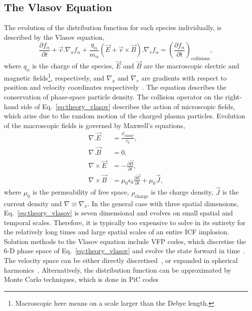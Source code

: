 \subsection{The Vlasov Equation}%
\label{sec:theory_vlasov}

The evolution of the distribution function for each species individually, is described by the Vlasov equation,
\begin{equation}
    \label{eq:theory_vlasov}
    \frac{\partial f_\alpha}{\partial t} + \vec{v}.\nabla_x f_\alpha + \frac{q_\alpha}{m_\alpha} (\vec{E} + \vec{v}\times\vec{B}) . \nabla_v f_\alpha = \left ( \frac{\partial f_\alpha}{\partial t} \right )_\text{collisions},
\end{equation}
where $q_\alpha$ is the charge of the species, $\vec{E}$ and $\vec{B}$ are the macroscopic electric and magnetic fields\footnote{Macroscopic here means on a scale larger than the Debye length.}, respectively, and $\nabla_x$ and $\nabla_v$ are gradients with respect to position and velocity coordinates respectively~\cite{bittencourt_fundamentals_2004}.
The equation describes the conservation of phase-space particle density.
The collision operator on the right-hand side of Eq.~\ref{eq:theory_vlasov} describes the action of microscopic fields, which arise due to the random motion of the charged plasma particles.
Evolution of the macroscopic fields is governed by Maxwell's equations,
\begin{align}
    \label{eq:theory_maxwell_eqs}
    \nabla.\vec{E} &= \frac{\rho_{\text{charge}}}{\epsilon_0},\\
    \nabla.\vec{B} &= 0,\\
    \nabla \times \vec{E} &= -\frac{\partial \vec{B}}{\partial t},\\
    \nabla \times \vec{B} &= \mu_0 \epsilon_0\frac{\partial \vec{E}}{\partial t} + \mu_0 \vec{J},
\end{align}
where $\mu_0$ is the permeability of free space, $\rho_{\text{charge}}$ is the charge density, $\vec{J}$ is the current density and $\nabla\equiv \nabla_x$.
In the general case with three spatial dimensions, Eq.~\ref{eq:theory_vlasov} is seven dimensional and evolves on small spatial and temporal scales.
Therefore, it is typically too expensive to solve in its entirety for the relatively long times and large spatial scales of an entire \ac{ICF} implosion.
Solution methods to the Vlasov equation include \ac{VFP} codes, which discretise the 6-D phase space of Eq.~\ref{eq:theory_vlasov} and evolve the state forward in time~\cite{thomas_review_2012}.
The velocity space can be either directly discretised~\cite{taitano_eulerian_2021}, or expanded in spherical harmonics~\cite{kingham_implicit_2004}.
Alternatively, the distribution function can be approximated by Monte Carlo techniques, which is done in \ac{PiC} codes~\cite{arber_contemporary_2015}

